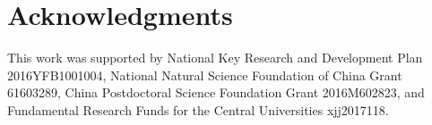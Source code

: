 \documentclass[journal]{IEEEtran}
\begin{document}
\section*{Acknowledgments}
This work was supported by National Key Research and Development Plan 2016YFB1001004,
National Natural Science Foundation of China Grant 61603289, China Postdoctoral
Science Foundation Grant 2016M602823, and Fundamental Research Funds for the Central Universities xjj2017118.


\ifCLASSOPTIONcaptionsoff
  \newpage
\fi







%
%
%
%

%
\end{document}
